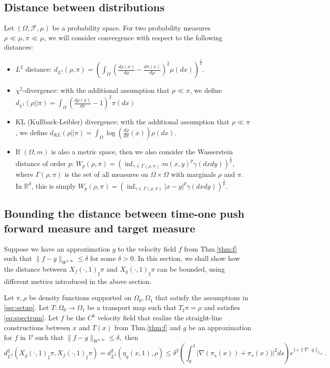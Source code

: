 \subsection{Distance between distributions}
Let $(\Omega, \mathcal{F}, \mu)$ be a probability space. For two probability measures $\rho\ll\mu, \pi\ll\mu$, we will consider convergence with respect to the following distances:
\begin{itemize}
\item $L^2$ distance: $d_{L^2}(\rho, \pi) = \left(\int_\Omega(\frac{d\rho(x)}{d\mu} - \frac{d\pi(x)}{d\mu})^2\mu(dx)\right)^{\frac{1}{2}}$.
    
    \item $\chi^2$-divergence: with the additional assumption that $\rho\ll\pi$, we define $d_{\chi^2}(\rho||\pi) = \int_{\Omega}(\frac{d\rho(x)}{d\pi}-1)^2 \pi(dx)$
    \item KL (Kullback-Leibler) divergence: with the additional assumption that $\rho\ll\pi$, we define $d_{KL}(\rho||\pi) = \int_\Omega \log(\frac{d\rho}{d\pi}(x))\rho(dx).$
    
    \item If $(\Omega, m)$ is also a metric space, then we also consider the Wasserstein distance of order $p$: $W_p(\rho, \pi) = \left(\inf_{\gamma\in\Gamma(\rho, \pi)}m(x, y)^p\gamma(dxdy)\right)^\frac{1}{p}$, where $\Gamma(\rho, \pi)$ is the set of all measures on $\Omega \times \Omega$ with marginals $\rho$ and $\pi$. In $\mathbb{R}^d$, this is simply $W_p(\rho, \pi) = \left(\inf_{\gamma\in\Gamma(\rho, \pi)}|x-y|^p\gamma(dxdy)\right)^\frac{1}{p}$.
    
\end{itemize}

\subsection{Bounding the distance between time-one push forward measure and target measure}
Suppose we have an approximation $g$ to the velocity field $f$ from Thm.\ref{thm:f} such that $\|f - g\|_{W^{1,\infty}}\leq \delta$ for some $\delta > 0$. In this section, we shall show how the distance between $X_f(\cdot,1)_\sharp\pi$ and $X_g(\cdot,1)_\sharp\pi$ can be bounded, using different metrics introduced in the above section. 

\begin{theorem}\label{thm:l2bound}
Let $\pi, \rho$ be density functions supported on $\Omega_0, \Omega_1$ that satisfy the assumptions in \ref{sec:setup}. Let $T: \Omega_0\rightarrow\Omega_1$ be a transport map such that $T_\sharp\pi = \rho$ and satisfies \eqref{eq:spectrum}. Let $f$ be the $C^k$ velocity field that realize the straight-line constructions between $x$ and $T(x)$ from Thm.\ref{thm:f} and $g$ be an approximation for $f$ in $\mathcal{V}$ such that $\|f - g\|_{W^{1, \infty}} \leq \delta,$ then 
$$d_{L^2}^2(X_g(\cdot,1)_\sharp\pi, X_f(\cdot,1)_\sharp\pi) = d_{L^2}^2(\eta_g(x,1), \rho)  \leq \delta^2(\int_0^1|\nabla(\pi_s(x)) + \pi_s(x))|^2ds)e^{1 + \|\nabla \cdot g\|_{L_\infty}}.$$ 
\end{theorem}

